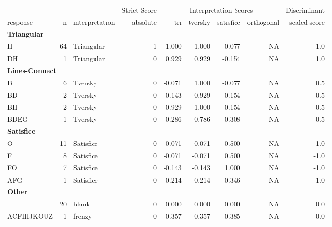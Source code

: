 \documentclass[
  letterpaper,
  DIV=11,
  numbers=noendperiod]{scrreprt}
\begin{document}
\begin{tabular}[t]{l|r|l|r|r|r|r|r|r}
\hline
\multicolumn{3}{c|}{ } & \multicolumn{1}{c|}{Strict Score} & \multicolumn{4}{c|}{Interpretation Scores} & \multicolumn{1}{c}{Discriminant} \\
\cline{4-4} \cline{5-8} \cline{9-9}
response & n & interpretation & absolute & tri & tversky & satisfice & orthogonal & scaled score\\
\hline
\multicolumn{9}{l}{\textbf{Triangular}}\\
\hline
\hspace{1em}H & 64 & Triangular & 1 & 1.000 & 1.000 & -0.077 & NA & 1.0\\
\hline
\hspace{1em}DH & 1 & Triangular & 0 & 0.929 & 0.929 & -0.154 & NA & 1.0\\
\hline
\multicolumn{9}{l}{\textbf{Lines-Connect}}\\
\hline
\hspace{1em}B & 6 & Tversky & 0 & -0.071 & 1.000 & -0.077 & NA & 0.5\\
\hline
\hspace{1em}BD & 2 & Tversky & 0 & -0.143 & 0.929 & -0.154 & NA & 0.5\\
\hline
\hspace{1em}BH & 2 & Tversky & 0 & 0.929 & 1.000 & -0.154 & NA & 0.5\\
\hline
\hspace{1em}BDEG & 1 & Tversky & 0 & -0.286 & 0.786 & -0.308 & NA & 0.5\\
\hline
\multicolumn{9}{l}{\textbf{Satisfice}}\\
\hline
\hspace{1em}O & 11 & Satisfice & 0 & -0.071 & -0.071 & 0.500 & NA & -1.0\\
\hline
\hspace{1em}F & 8 & Satisfice & 0 & -0.071 & -0.071 & 0.500 & NA & -1.0\\
\hline
\hspace{1em}FO & 7 & Satisfice & 0 & -0.143 & -0.143 & 1.000 & NA & -1.0\\
\hline
\hspace{1em}AFG & 1 & Satisfice & 0 & -0.214 & -0.214 & 0.346 & NA & -1.0\\
\hline
\multicolumn{9}{l}{\textbf{Other}}\\
\hline
\hspace{1em} & 20 & blank & 0 & 0.000 & 0.000 & 0.000 & NA & 0.0\\
\hline
\hspace{1em}ACFHIJKOUZ & 1 & frenzy & 0 & 0.357 & 0.357 & 0.385 & NA & 0.0\\

\end{tabular}
\end{document}
